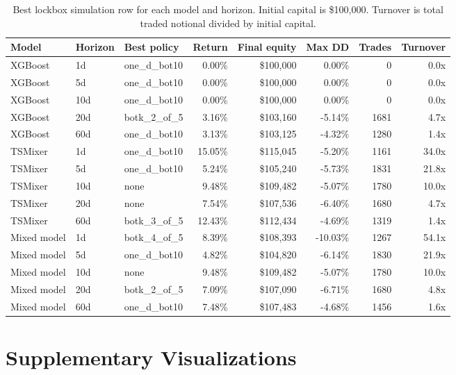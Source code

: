 \documentclass[sigconf,nonacm]{acmart}
\begin{document}
\begin{table}[H]
\centering
\scriptsize
\caption{Best lockbox simulation row for each model and horizon. Initial capital is \$100,000. Turnover is total traded notional divided by initial capital.}
\begin{tabular}{@{}lllrrrrr@{}}
\toprule
Model & Horizon & Best policy & Return & Final equity & Max DD & Trades & Turnover \\
\midrule
XGBoost & 1d & one\_d\_bot10 & 0.00\% & \$100,000 & 0.00\% & 0 & 0.0x \\
XGBoost & 5d & one\_d\_bot10 & 0.00\% & \$100,000 & 0.00\% & 0 & 0.0x \\
XGBoost & 10d & one\_d\_bot10 & 0.00\% & \$100,000 & 0.00\% & 0 & 0.0x \\
XGBoost & 20d & botk\_2\_of\_5 & 3.16\% & \$103,160 & -5.14\% & 1681 & 4.7x \\
XGBoost & 60d & one\_d\_bot10 & 3.13\% & \$103,125 & -4.32\% & 1280 & 1.4x \\
TSMixer & 1d & one\_d\_bot10 & 15.05\% & \$115,045 & -5.20\% & 1161 & 34.0x \\
TSMixer & 5d & one\_d\_bot10 & 5.24\% & \$105,240 & -5.73\% & 1831 & 21.8x \\
TSMixer & 10d & none & 9.48\% & \$109,482 & -5.07\% & 1780 & 10.0x \\
TSMixer & 20d & none & 7.54\% & \$107,536 & -6.40\% & 1680 & 4.7x \\
TSMixer & 60d & botk\_3\_of\_5 & 12.43\% & \$112,434 & -4.69\% & 1319 & 1.4x \\
Mixed model & 1d & botk\_4\_of\_5 & 8.39\% & \$108,393 & -10.03\% & 1267 & 54.1x \\
Mixed model & 5d & one\_d\_bot10 & 4.82\% & \$104,820 & -6.14\% & 1830 & 21.9x \\
Mixed model & 10d & none & 9.48\% & \$109,482 & -5.07\% & 1780 & 10.0x \\
Mixed model & 20d & botk\_2\_of\_5 & 7.09\% & \$107,090 & -6.71\% & 1680 & 4.8x \\
Mixed model & 60d & one\_d\_bot10 & 7.48\% & \$107,483 & -4.68\% & 1456 & 1.6x \\
\bottomrule
\end{tabular}
\label{tab:portfolio_model_horizon_results}
\end{table}

\section{Supplementary Visualizations}
\end{document}
